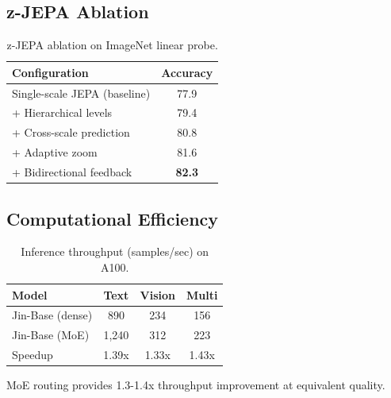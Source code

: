 \subsection{z-JEPA Ablation}

\begin{table}[h]
\centering
\caption{z-JEPA ablation on ImageNet linear probe.}
\label{tab:zjepa_ablation}
\begin{tabular}{lc}
\toprule
\textbf{Configuration} & \textbf{Accuracy} \\
\midrule
Single-scale JEPA (baseline) & 77.9 \\
+ Hierarchical levels & 79.4 \\
+ Cross-scale prediction & 80.8 \\
+ Adaptive zoom & 81.6 \\
+ Bidirectional feedback & \textbf{82.3} \\
\bottomrule
\end{tabular}
\end{table}

\subsection{Computational Efficiency}

\begin{table}[h]
\centering
\caption{Inference throughput (samples/sec) on A100.}
\label{tab:throughput}
\begin{tabular}{lccc}
\toprule
\textbf{Model} & \textbf{Text} & \textbf{Vision} & \textbf{Multi} \\
\midrule
Jin-Base (dense) & 890 & 234 & 156 \\
Jin-Base (MoE) & 1,240 & 312 & 223 \\
Speedup & 1.39x & 1.33x & 1.43x \\
\bottomrule
\end{tabular}
\end{table}

MoE routing provides 1.3-1.4x throughput improvement at equivalent quality.

